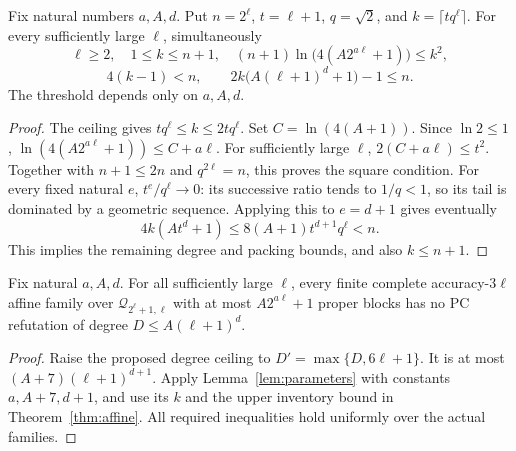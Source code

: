 \begin{lemma}\label{lem:parameters}
Fix natural numbers \(a,A,d\). Put \(n=2^\ell\), \(t=\ell+1\),
\(q=\sqrt2\), and \(k=\lceil t q^\ell\rceil\).
For every sufficiently large \(\ell\), simultaneously
\[
 \ell\ge2,\quad 1\le k\le n+1,\quad
 (n+1)\ln\bigl(4(A2^{a\ell}+1)\bigr)\le k^2,
\]
\[
 4(k-1)<n,\qquad 2k\bigl(A(\ell+1)^d+1\bigr)-1\le n.
\]
The threshold depends only on \(a,A,d\).
\end{lemma}
\begin{proof}
The ceiling gives \(tq^\ell\le k\le2tq^\ell\).
Set \(C=\ln(4(A+1))\). Since \(\ln2\le1\),
\(\ln(4(A2^{a\ell}+1))\le C+a\ell\).
For sufficiently large \(\ell\), \(2(C+a\ell)\le t^2\).
Together with \(n+1\le2n\) and \(q^{2\ell}=n\), this proves the
square condition. For every fixed natural \(e\),
\(t^e/q^\ell\longrightarrow0\): its successive ratio tends to
\(1/q<1\), so its tail is dominated by a geometric sequence.
Applying this to \(e=d+1\) gives eventually
\[
 4k(At^d+1)\le8(A+1)t^{d+1}q^\ell<n.
\]
This implies the remaining degree and packing bounds, and also \(k\le n+1\).
\end{proof}

\begin{corollary}
\label{cor:polylog-exclusion}
Fix natural \(a,A,d\). For all sufficiently large \(\ell\), every finite
complete accuracy-\(3\ell\) affine family over \(\mathcal Q_{2^\ell+1,\ell}\)
with at most \(A2^{a\ell}+1\) proper blocks has no PC refutation of degree
\(D\le A(\ell+1)^d\).
\end{corollary}
\begin{proof}
Raise the proposed degree ceiling to \(D'=\max\{D,6\ell+1\}\).
It is at most \((A+7)(\ell+1)^{d+1}\). Apply
Lemma~\ref{lem:parameters} with constants \(a,A+7,d+1\), and use its
\(k\) and the upper inventory bound in Theorem~\ref{thm:affine}.
All required inequalities hold uniformly over the actual families.
\end{proof}
